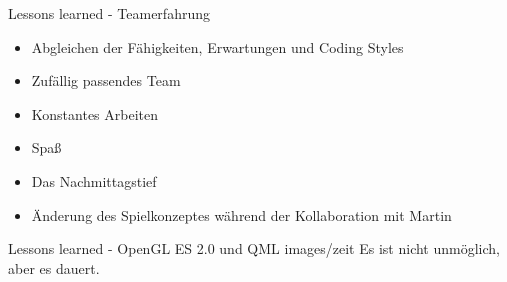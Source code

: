 \begin{frame}{Lessons learned - Teamerfahrung}
	\onetoone
	{
	\begin{itemize}
		\item Abgleichen der Fähigkeiten, Erwartungen und Coding Styles
		\item Zufällig passendes Team
		\item Konstantes Arbeiten
		\item Spaß
	\end{itemize}
	}
	{
	\begin{itemize}
		\item Das Nachmittagstief
		\item Änderung des Spielkonzeptes während der Kollaboration mit Martin
	\end{itemize}
	}
	\begin{figure}
		\centering
	\end{figure}
\end{frame}

\slidegraphic
{Lessons learned - OpenGL ES 2.0 und QML}
{images/zeit}
{Es ist nicht unmöglich, aber es dauert.}


%

